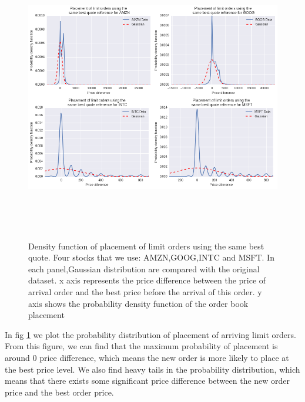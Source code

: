 \begin{figure}[hbtp]
	\begin{center}
		\includegraphics[width=6in,height=5in]{figures/placement.png}
	\end{center}
	\caption{Density function of placement of limit orders using the same best quote. Four stocks that we use: AMZN,GOOG,INTC and MSFT. In each panel,Gaussian distribution are compared with the original dataset. x axis represents the price difference between the price of arrival order and the best price before the arrival of this order. y axis shows the probability density function of the order book placement} \label{fig:placement}
\end{figure}

In fig \ref{fig:placement} we plot the probability distribution of placement of arriving limit orders. From this figure, we can find that the maximum probability of placement is around 0 price difference, which means the new order is more likely to place at the best price level. We also find heavy tails in the probability distribution, which means that there exists some significant price difference between the new order price and the best order price.  

